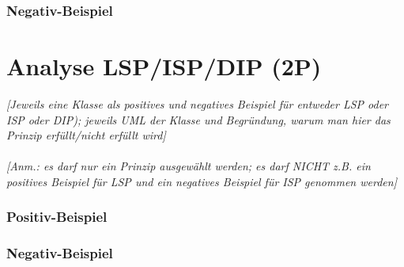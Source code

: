 \subsubsection{Negativ-Beispiel}

\section{Analyse LSP/ISP/DIP (2P)}
\emph{[Jeweils eine Klasse als positives und negatives Beispiel für entweder LSP oder ISP oder DIP); jeweils
UML der Klasse und Begründung, warum man hier das Prinzip erfüllt/nicht erfüllt wird]}
\\
\\
\emph{[Anm.: es darf nur ein Prinzip ausgewählt werden; es darf NICHT z.B. ein positives Beispiel für LSP
und ein negatives Beispiel für ISP genommen werden]}

\subsubsection{Positiv-Beispiel}
\subsubsection{Negativ-Beispiel}